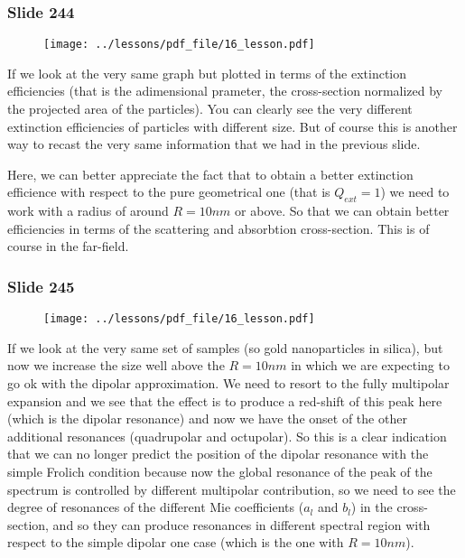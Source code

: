 \documentclass[../main/main.tex]{subfiles}
\begin{document}
\newpage

\subsubsection{Slide 244}

\begin{figure}[h!]
\centering
\texttt{[image: ../lessons/pdf\_file/16\_lesson.pdf]}
\end{figure}

If we look at the very same graph but plotted in terms of the extinction efficiencies (that is the adimensional prameter, the cross-section normalized by the projected area of the particles). You can clearly see the very different extinction efficiencies of particles with different size.
But of course this is another way to recast the very same information that we had in the previous slide.

Here, we can better appreciate the fact that to obtain a better extinction efficience with respect to the pure geometrical one (that is \( Q_{ext}=1 \)) we need to work with a radius of around \( R=10nm \) or above. So that we can obtain better efficiencies in terms of the scattering and absorbtion cross-section.
This is of course in the far-field.

\newpage

\subsubsection{Slide 245}

\begin{figure}[h!]
\centering
\texttt{[image: ../lessons/pdf\_file/16\_lesson.pdf]}
\end{figure}

If we look at the very same set of samples (so gold nanoparticles in silica), but now we increase the size well above the \( R=10nm \) in which we are expecting to go ok with the dipolar approximation. We need to resort to the fully multipolar expansion and we see that the effect is to produce a red-shift of this peak here (which is the dipolar resonance) and now we have the onset of the other additional resonances (quadrupolar and octupolar).
So this is a clear indication that we can no longer predict the position of the dipolar resonance with the simple Frolich condition because now the global resonance of the peak of the spectrum is controlled by different multipolar contribution, so we need to see the degree of resonances of the different Mie coefficients (\( a_l \) and \( b_l \)) in the cross-section, and so they can produce  resonances in different spectral region with respect to the simple dipolar one case (which is the one with \( R=10nm \)).
\end{document}
